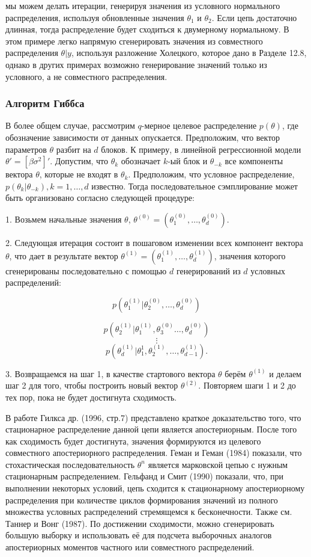 мы можем делать итерации, генерируя значения из условного нормального распределения, используя обновленные значения $\theta_1$ и $\theta_2$. Если цепь достаточно длинная, тогда распределение будет сходиться к двумерному нормальному. В этом примере легко напрямую сгенерировать значения из совместного распределения $\theta|y$, используя разложение Холецкого, которое дано в Разделе 12.8, однако в других примерах возможно генерирование  значений только из условного, а не совместного распределения.

\subsubsection*{Алгоритм Гиббса}

В более общем случае, рассмотрим $q$-мерное целевое распределение $p(\theta)$, где обозначение зависимости от данных опускается. Предположим, что вектор параметров $\theta$ разбит на $d$ блоков. К примеру, в линейной регрессионной модели $\theta'=[\beta {\sigma}^{2}]'$. Допустим, что $\theta_k$ обозначает $k$-ый блок и $\theta_{-k}$ все компоненты вектора $\theta$, которые не входят в $\theta_k$. Предположим, что условное распределение, $p(\theta_{k}|{\theta}_{-k}), k=1,\ldots ,d$ известно. Тогда последовательное сэмплирование может быть организовано согласно следующей процедуре:

1. Возьмем начальные значения $\theta$, $\theta^{(0)}=(\theta^{(0)}_1,\ldots ,\theta^{(0)}_d)$.

2. Следующая итерация состоит в пошаговом изменении всех компонент вектора $\theta$, что дает в результате вектор $\theta^{(1)}=(\theta^{(1)}_1,\ldots ,\theta^{(1)}_d)$, значения которого сгенерированы последовательно с помощью $d$ генерирований из $d$ условных распределений:

\[
p(\theta^{(1)}_1|\theta^{(0)}_2,\ldots ,\theta^{(0)}_d)
\]

\[
p(\theta^{(1)}_2|\theta^{(1)}_1,\theta^{(0)}_3\ldots ,\theta^{(0)}_d)
\]
\[
\vdots
\]
\[
p(\theta^{(1)}_d|\theta^{1}_1,\theta^{(1)}_2,\ldots ,\theta^{(1)}_{d-1}).
\]

3. Возвращаемся на шаг 1, в качестве стартового вектора $\theta$ берём $\theta^{(1)}$ и делаем шаг 2 для того, чтобы построить новый вектор $\theta^{(2)}$. Повторяем шаги 1 и 2 до тех пор, пока не будет достигнута сходимость.

В работе Гилкса др. (1996, стр.7) представлено краткое доказательство того, что стационарное распределение данной цепи является апостериорным. После того как сходимость будет достигнута, значения формируются из целевого совместного апостериорного распределения. Геман и Геман (1984) показали, что стохастическая последовательность ${\theta^{n}}$ является марковской цепью с нужным стационарным распределением. Гельфанд и Смит (1990) показали, что, при выполнении некоторых условий, цепь сходится к стационарному апостериорному распределения при количестве циклов формирования значений из полного множества условных распределений стремящемся к бесконечности. Также см. Таннер и Вонг (1987). По достижении сходимости, можно сгенерировать большую выборку и использовать её для подсчета выборочных аналогов апостериорных моментов частного или совместного распределений.

